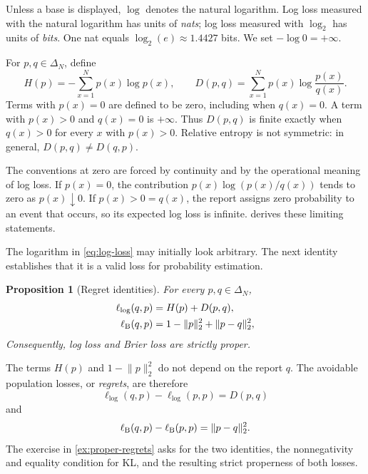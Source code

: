 \documentclass[11pt,twoside]{article}
\newcommand{\KL}{D}
\newtheorem{proposition}[theorem]{Proposition}
\theoremstyle{definition}
\theoremstyle{remark}
\begin{document}
Unless a base is displayed, $\log$ denotes the natural logarithm. Log loss
measured with the natural logarithm has units of \emph{nats}; log loss measured
with $\log_2$ has units of \emph{bits}. One nat equals
$\log_2(e)\approx1.4427$ bits. We set $-\log 0=+\infty$.

For $p,q\in\Delta_N$, define
\begin{equation}
H(p)=-\sum_{x=1}^N p(x)\log p(x),
\qquad
\KL(p, q)=\sum_{x=1}^N p(x)\log\frac{p(x)}{q(x)}.
\label{eq:entropy-kl}
\end{equation}
Terms with $p(x)=0$ are defined to be zero, including when $q(x)=0$. A term
with $p(x)>0$ and $q(x)=0$ is $+\infty$. Thus $\KL(p, q)$ is finite
exactly when $q(x)>0$ for every $x$ with $p(x)>0$. Relative entropy is not
symmetric: in general, $\KL(p, q)\ne\KL(q, p)$.

The conventions at zero are forced by continuity and by the operational
meaning of log loss. If \(p(x)=0\), the contribution
\(p(x)\log(p(x)/q(x))\) tends to zero as \(p(x)\downarrow0\). If
\(p(x)>0=q(x)\), the report assigns zero probability to an event that occurs,
so its expected log loss is infinite.  derives these
limiting statements.

The logarithm in \cref{eq:log-loss} may initially look arbitrary. The next
identity establishes that it is a valid loss for probability estimation.

\begin{proposition}[Regret identities]
\label{prop:regret-identities}
For every $p,q\in\Delta_N$,
\begin{align}
\ell_{\log}(q,p)
&=H(p)+\KL(p, q),
\label{eq:log-regret}\\
\ell_{\rm B}(q,p)
&=1-\lVert p\rVert_2^2+\lVert p-q\rVert_2^2,
\label{eq:brier-regret}
\end{align}
Consequently, log loss and Brier loss are strictly proper.
\end{proposition}

The terms $H(p)$ and $1-\lVert p\rVert_2^2$ do not depend on the report $q$.
The avoidable population losses, or \emph{regrets}, are therefore
\begin{equation}
\ell_{\log}(q,p)-\ell_{\log}(p,p)=\KL(p, q)
\label{eq:log-regret-short}
\end{equation}
and
\begin{equation}
\ell_{\rm B}(q,p)-\ell_{\rm B}(p,p)=\lVert p-q\rVert_2^2.
\label{eq:brier-regret-short}
\end{equation}
The exercise in \cref{ex:proper-regrets} asks for the two identities, the
nonnegativity and equality condition for KL, and the resulting strict
properness of both losses.
\end{document}
